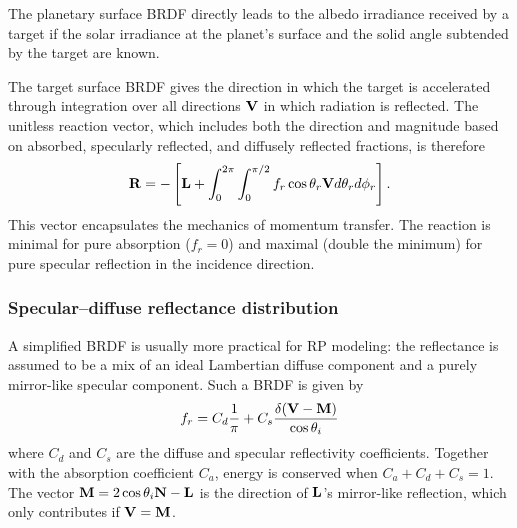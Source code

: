 The planetary surface \gls{BRDF} directly leads to the albedo irradiance received by a target if the solar irradiance at the planet's surface and the solid angle subtended by the target are known.

The target surface \gls{BRDF} gives the direction in which the target is accelerated through integration over all directions $\vb V$ in which radiation is reflected. The unitless reaction vector, which includes both the direction and magnitude based on absorbed, specularly reflected, and diffusely reflected fractions, is therefore~\cite{Wetterer2014}
\begin{align}
    \label{eq:brdf-reaction-general}
    \vb R = -\left[ \vb L + \int_{0}^{2\pi} \int_{0}^{\pi/2} f_r \cos\theta_r \vb V d\theta_r d\phi_r \right].
\end{align}
This vector encapsulates the mechanics of momentum transfer. The reaction is minimal for pure absorption ($f_r = 0$) and maximal (double the minimum) for pure specular reflection in the incidence direction.

\subsubsection{Specular--diffuse reflectance distribution}
A simplified \gls{BRDF} is usually more practical for \gls{RP} modeling: the reflectance is assumed to be a mix of an ideal Lambertian diffuse component and a purely mirror-like specular component. Such a \gls{BRDF} is given by~\cite{Wetterer2014}
\begin{align}
    \label{eq:brdf-specular-diffuse}
    f_r = C_d \frac{1}{\pi} + C_s \frac{\delta(\vb V - \vb M)}{\cos \theta_i}
\end{align}
where $C_d$ and $C_s$ are the diffuse and specular reflectivity coefficients. Together with the absorption coefficient $C_a$, energy is conserved when $C_a + C_d + C_s = 1$. The vector $\vb M = 2\cos\theta_i\vb N - \vb L$ is the direction of $\vb L$'s mirror-like reflection, which only contributes if $\vb V = \vb M$.

